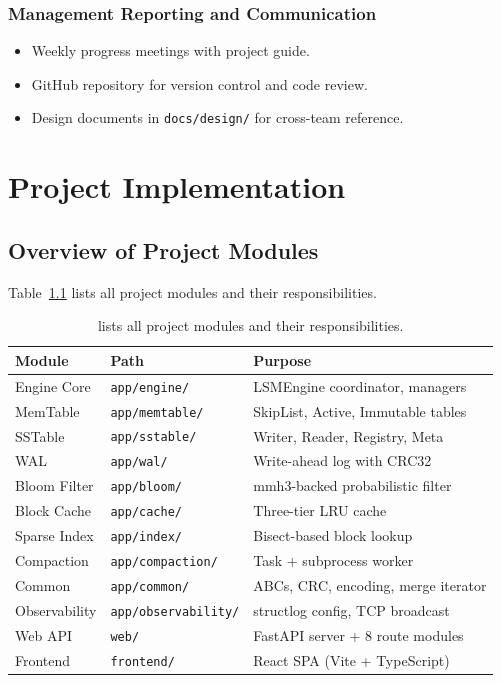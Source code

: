 \documentclass[oneside,a4paper,12pt]{book}
\begin{document}
\subsection{Management Reporting and Communication}
\begin{itemize}[leftmargin=2em]
    \item Weekly progress meetings with project guide.
    \item GitHub repository for version control and code review.
    \item Design documents in \texttt{docs/design/} for cross-team reference.
\end{itemize}


\chapter{Project Implementation}

\section{Overview of Project Modules}

Table~\ref{tab:modules} lists all project modules and their responsibilities.

\begin{table}[!htbp]
\centering
\label{tab:modules}
\renewcommand{\arraystretch}{1.2}
\begin{tabular}{|l|l|l|}
\hline
\textbf{Module} & \textbf{Path} & \textbf{Purpose} \\
\hline
Engine Core & \texttt{app/engine/} & LSMEngine coordinator, managers \\
\hline
MemTable & \texttt{app/memtable/} & SkipList, Active, Immutable tables \\
\hline
SSTable & \texttt{app/sstable/} & Writer, Reader, Registry, Meta \\
\hline
WAL & \texttt{app/wal/} & Write-ahead log with CRC32 \\
\hline
Bloom Filter & \texttt{app/bloom/} & mmh3-backed probabilistic filter \\
\hline
Block Cache & \texttt{app/cache/} & Three-tier LRU cache \\
\hline
Sparse Index & \texttt{app/index/} & Bisect-based block lookup \\
\hline
Compaction & \texttt{app/compaction/} & Task + subprocess worker \\
\hline
Common & \texttt{app/common/} & ABCs, CRC, encoding, merge iterator \\
\hline
Observability & \texttt{app/observability/} & structlog config, TCP broadcast \\
\hline
Web API & \texttt{web/} & FastAPI server + 8 route modules \\
\hline
Frontend & \texttt{frontend/} & React SPA (Vite + TypeScript) \\
\hline
\end{tabular}
\caption{lists all project modules and their responsibilities.}
\end{table}
\end{document}
